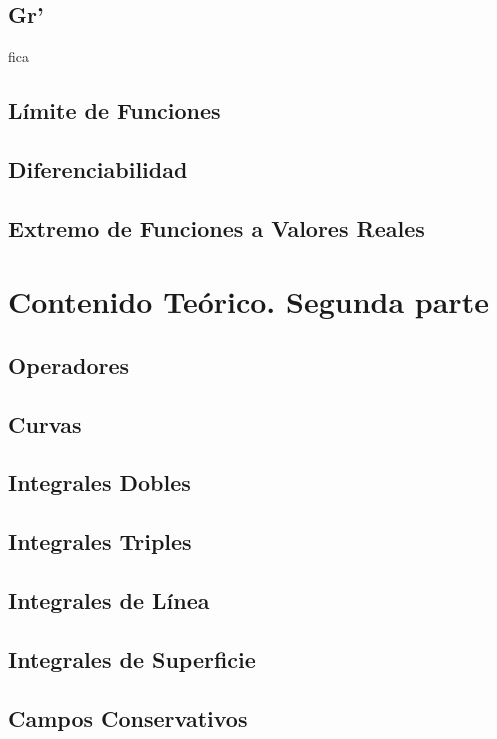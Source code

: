 \documentclass[10pt, a4paper]{report}
\begin{document}
        \section{Gr\a'}fica
            
        \section{L\'imite de Funciones}
            
        \section{Diferenciabilidad}
            
        \section{Extremo de Funciones a Valores Reales} 
            

    \chapter{Contenido Teórico. Segunda parte}
        \section{Operadores}
            
        \section{Curvas}
            
        \section{Integrales Dobles} 
            
        \section{Integrales Triples}
            
        \section{Integrales de L\'inea}
            
        \section{Integrales de Superficie}
        \section{Campos Conservativos}
            
\end{document}
